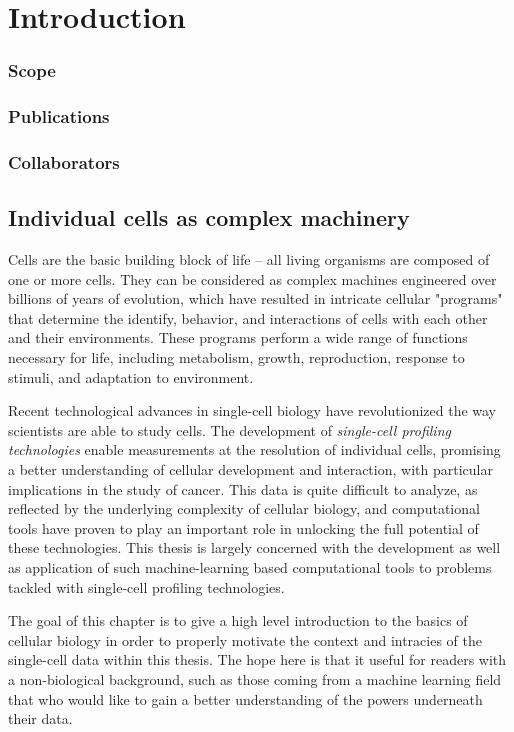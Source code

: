 \chapter{Introduction}
\subsection{Scope}
\subsection{Publications}
\subsection{Collaborators}

\section{Individual cells as complex machinery}
Cells are the basic building block of life -- all living organisms are composed of one or more cells.
They can be considered as complex machines engineered over billions of years of evolution,
which have resulted in intricate cellular "programs" that determine the identify, behavior, and interactions of cells with each other and their environments.
These programs perform a wide range of functions necessary for life, including metabolism, growth, reproduction, response to stimuli, and adaptation to environment.

Recent technological advances in single-cell biology have revolutionized the way scientists are able to study cells.
The development of \emph{single-cell profiling technologies} enable measurements at the resolution of individual cells,
promising a better understanding of cellular development and interaction, with particular implications in the study of cancer.
This data is quite difficult to analyze, as reflected by the underlying complexity of cellular biology, and
computational tools have proven to play an important role in unlocking the full potential of these technologies.
This thesis is largely concerned with the development as well as application of such machine-learning based computational tools to problems tackled with single-cell profiling technologies.

The goal of this chapter is to give a high level introduction to the basics of cellular biology in order to properly motivate the context and intracies of the single-cell data within this thesis.
The hope here is that it useful for readers with a non-biological background, such as those coming from a machine learning field that who would like to gain a better understanding of the powers underneath their data.

